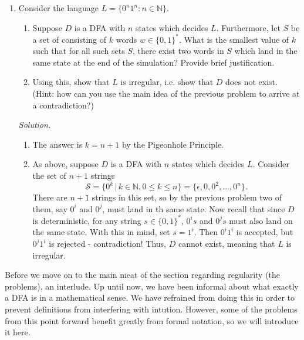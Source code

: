 \documentclass[11pt]{article}
\newcounter{enum}
\newcommand{\solution}
{
\vspace{5pt}
\noindent\textit{Solution.}\qquad
}
\begin{document}
\begin{enumerate}
\setcounter{enumi}{\theenum}

\item Consider the language $L=\{0^n1^n:n\in\mathbb{N}\}$.

\begin{enumerate}

\item Suppose $D$ is a DFA with $n$ states which decides $L$.  Furthermore, let $S$ be a set of consisting of $k$ words $w\in \{0,1\}^*$.  What is the smallest value of $k$ such that for all such sets $S$, there exist two words in $S$ which land in the same state at the end of the simulation?  Provide brief justification.

\item Using this, show that $L$ is irregular, i.e. show that $D$ does not exist.  (Hint: how can you use the main idea of the previous problem to arrive at a contradiction?)

\end{enumerate}

\solution

\begin{enumerate}

\item The answer is $k=n+1$ by the Pigeonhole Principle.

\item As above, suppose $D$ is a DFA with $n$ states which decides $L$.  Consider the set of $n+1$ strings \[\mathcal{S} = \{0^k\,|\,k\in\mathbb{N}, 0\leq k\leq n\} = \{\epsilon, 0,0^2,\ldots, 0^n\}.\] There are $n+1$ strings in this set, so by the previous problem two of them, say $0^i$ and $0^j$, must land in th same state.  Now recall that since $D$ is deterministic, for any string $s\in\{0,1\}^*$, $0^is$ and $0^js$ must also land on the same state.  With this in mind, set $s=1^i$.  Then $0^i1^i$ is accepted, but $0^j1^i$ is rejected - contradiction!  Thus, $D$ cannot exist, meaning that $L$ is irregular.

\end{enumerate}

\setcounter{enum}{\theenumi}
\end{enumerate}

\par Before we move on to the main meat of the section regarding regularity (the problems), an interlude.  Up until now, we have been informal about what exactly a DFA is in a mathematical sense.  We have refrained from doing this in order to prevent definitions from interfering with intution.  However, some of the problems from this point forward benefit greatly from formal notation, so we will introduce it here.
\end{document}

